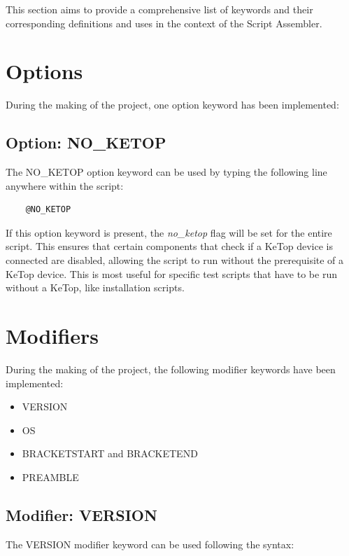 
This section aims to provide a comprehensive list of keywords and their corresponding definitions and uses in the context of the Script Assembler. 

\section{Options}

During the making of the project, one option keyword has been implemented: 

\subsection{Option: NO\_KETOP}

The NO\_KETOP option keyword can be used by typing the following line anywhere within the script:

\begin{verbatim}
    @NO_KETOP
\end{verbatim}

If this option keyword is present, the \textit{no\_ketop} flag will be set for the entire script. This ensures that certain components that check if a KeTop device is connected are disabled, allowing the script to run without the prerequisite of a KeTop device. This is most useful for specific test scripts that have to be run without a KeTop, like installation scripts. 

\section{Modifiers}

During the making of the project, the following modifier keywords have been implemented:

\begin{itemize}
    \item VERSION
    \item OS
    \item BRACKETSTART and BRACKETEND
    \item PREAMBLE
\end{itemize}

\subsection{Modifier: VERSION}

The VERSION modifier keyword can be used following the syntax:

